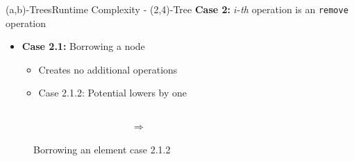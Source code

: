 \begin{frame}{(a,b)-Trees}{Runtime Complexity - (2,4)-Tree}
  \textbf{Case 2:}
  {\color{Mittel-Blau}$i$}-\textit{th} operation is an
  \texttt{\color{Mittel-Blau}remove} operation
  \begin{itemize}
    \item<2->
    \textbf{Case 2.1:} Borrowing a node
    \begin{itemize}
      \item<3->
      Creates no additional operations
      \item<4->
      Case 2.1.2: Potential lowers by one
    \end{itemize}
  \end{itemize}
  \begin{figure}
    \begin{columns}
      \begin{column}{0.35\linewidth}
        \begin{adjustbox}{width=\linewidth}
          
        \end{adjustbox}
      \end{column}
      \begin{column}{0.1\linewidth}
        \begin{center}
          $\Rightarrow$
        \end{center}
      \end{column}
      \begin{column}{0.35\linewidth}
        \begin{adjustbox}{width=\linewidth}
          
        \end{adjustbox}
      \end{column}
    \end{columns}
    \caption{Borrowing an element case 2.1.2}
    \label{fig:a_b_tree:move_potential_2}
  \end{figure}
\end{frame}


